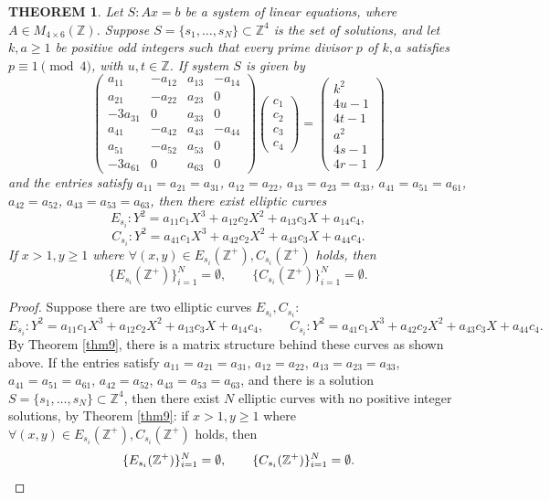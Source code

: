 \documentclass[11pt]{amsart}
\newtheorem{theorem}{THEOREM}
\begin{document}
\begin{theorem}\label{thm11}
Let $S: Ax=b$ be a system of linear equations, where $A\in M_{4\times6}(\mathbb{Z})$. Suppose $S=\{s_1,\dots,s_N\}\subset\mathbb{Z}^4$ is the set of solutions, and let $k,a\ge1$ be positive odd integers such that every prime divisor $p$ of $k,a$ satisfies $p\equiv1\pmod4$, with $u,t\in\mathbb{Z}$. If system $S$ is given by
\[
\begin{pmatrix}
a_{11}&-a_{12}&a_{13}&-a_{14}\\
a_{21}&-a_{22}&a_{23}&0\\
-3a_{31}&0&a_{33}&0\\
a_{41}&-a_{42}&a_{43}&-a_{44}\\
a_{51}&-a_{52}&a_{53}&0\\
-3a_{61}&0&a_{63}&0
\end{pmatrix}
\begin{pmatrix}c_1\\c_2\\c_3\\c_4\end{pmatrix}
=\begin{pmatrix}k^2\\4u-1\\4t-1\\a^2\\4s-1\\4r-1\end{pmatrix}
\]
and the entries satisfy $a_{11}=a_{21}=a_{31}$, $a_{12}=a_{22}$, $a_{13}=a_{23}=a_{33}$, $a_{41}=a_{51}=a_{61}$, $a_{42}=a_{52}$, $a_{43}=a_{53}=a_{63}$, then there exist elliptic curves
\[
E_{s_i}: Y^2=a_{11}c_1X^3+a_{12}c_2X^2+a_{13}c_3X+a_{14}c_4,
\]
\[
C_{s_i}: Y^2=a_{41}c_1X^3+a_{42}c_2X^2+a_{43}c_3X+a_{44}c_4.
\]
If $x>1,y\ge1$ where $\forall(x,y)\in E_{s_i}(\mathbb{Z}^+),C_{s_i}(\mathbb{Z}^+)$ holds, then
\[
\{E_{s_i}(\mathbb{Z}^+)\}_{i=1}^N=\emptyset, \qquad \{C_{s_i}(\mathbb{Z}^+)\}_{i=1}^N=\emptyset.
\]
\end{theorem}

\begin{proof}
Suppose there are two elliptic curves $E_{s_i},C_{s_i}$:
\[
E_{s_i}: Y^2=a_{11}c_1X^3+a_{12}c_2X^2+a_{13}c_3X+a_{14}c_4, \qquad
C_{s_i}: Y^2=a_{41}c_1X^3+a_{42}c_2X^2+a_{43}c_3X+a_{44}c_4.
\]
By Theorem \ref{thm9}, there is a matrix structure behind these curves as shown above. If the entries satisfy $a_{11}=a_{21}=a_{31}$, $a_{12}=a_{22}$, $a_{13}=a_{23}=a_{33}$, $a_{41}=a_{51}=a_{61}$, $a_{42}=a_{52}$, $a_{43}=a_{53}=a_{63}$, and there is a solution $S=\{s_1,\dots,s_N\}\subset\mathbb{Z}^4$, then there exist $N$ elliptic curves with no positive integer solutions, by Theorem \ref{thm9}: if $x>1,y\ge1$ where $\forall(x,y)\in E_{s_i}(\mathbb{Z}^+),C_{s_i}(\mathbb{Z}^+)$ holds, then
\[
\{E_{s_i}(\mathbb{Z}^+)\}_{i=1}^N=\emptyset, \qquad \{C_{s_i}(\mathbb{Z}^+)\}_{i=1}^N=\emptyset. \qedhere
\]
\end{proof}
\end{document}
